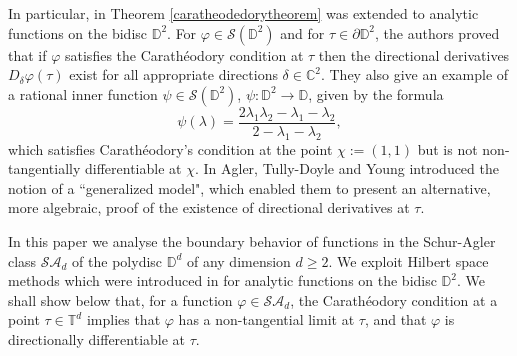 \documentclass[11pt, reqno]{amsart}
\newcommand\1{\boldsymbol {1}}
\newcommand\lam{\lambda}
\newcommand{\T}{\mathbb{T}}
\newcommand{\D}{\mathbb{D}}
\newcommand{\C}{\mathbb{C}}
\newcommand{\ph}{\varphi}
\newcommand\de{\delta}
\numberwithin{equation}{section}
\begin{document}
In particular, in \cite{AMYcara} Theorem \ref{caratheodedorytheorem}  was extended to analytic functions on the bidisc $\mathbb{D}^{2}$. For $\ph \in \mathcal{S}(\mathbb{D}^{2})$ and for 
$\tau \in \partial \D^2$, the authors  proved that if $\ph$ satisfies the Carath\'eodory condition at $\tau$ then  the directional derivatives $D_{\delta}\ph(\tau)$ exist for all appropriate directions $\de \in\C^2$. 
They also give an example of a rational inner function $\psi \in \mathcal{S}(\mathbb{D}^{2})$, 
$\psi:\D^2 \to \D$, given by the formula
\[
\psi(\lam)= \frac{2\lam_1\lam_2 -\lam_1-\lam_2}{2-\lam_1-\lam_2},
\]
which satisfies Carath\'{e}odory’s condition at the point $\chi:= (1,1)$ but
is not non-tangentially differentiable at  $\chi$. In \cite{ATY2} Agler, Tully-Doyle and  Young  introduced the notion of a ``generalized model", which enabled them  to present an alternative, more algebraic, proof of the existence of directional derivatives at $\tau$.


In this paper we analyse the boundary behavior of functions in the Schur-Agler class $\mathcal{SA}_{d}$ of the polydisc $\mathbb{D}^{d}$ of any dimension $d\geq 2$. We exploit Hilbert space methods which were introduced in \cite{ATY2} for analytic functions on the bidisc $\mathbb{D}^{2}$. 
We shall show below that, for a function $\ph\in\mathcal{SA}_d$, the Carath\'eodory condition at a point $\tau\in\T^d$ implies that $\ph$ has a non-tangential limit at $\tau$, and that $\varphi$ is directionally differentiable at $\tau$.  
\end{document}
